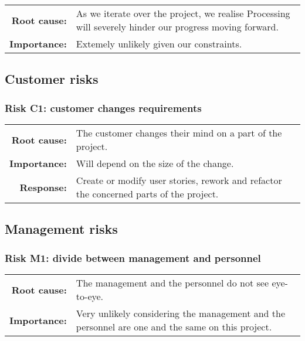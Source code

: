 \begin{tabularx}{\textwidth}{rX}
\textbf{Root cause:} & As we iterate over the project, we realise Processing will severely hinder our progress moving forward. \\
\textbf{Importance:} & Extemely unlikely given our constraints. \\
\end{tabularx}

\subsection{Customer risks}

\subsubsection{Risk C1: customer changes requirements}

\begin{tabularx}{\textwidth}{rX}
\textbf{Root cause:} & The customer changes their mind on a part of the project. \\
\textbf{Importance:} & Will depend on the size of the change. \\
\textbf{Response:} & Create or modify user stories, rework and refactor the concerned parts of the project. \\
\end{tabularx}

\subsection{Management risks}

\subsubsection{Risk M1: divide between management and personnel}

\begin{tabularx}{\textwidth}{rX}
\textbf{Root cause:} & The management and the personnel do not see eye-to-eye. \\
\textbf{Importance:} & Very unlikely considering the management and the personnel are one and the same on this project. \\
\end{tabularx}

